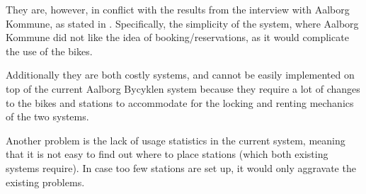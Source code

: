 They are, however, in conflict with the results from the interview with Aalborg Kommune, as stated in .
Specifically, the simplicity of the system, where Aalborg Kommune did not like the idea of booking/reservations, as it would complicate the use of the bikes.

Additionally they are both costly systems, and cannot be easily implemented on top of the current Aalborg Bycyklen system because they require a lot of changes to the bikes and stations to accommodate for the locking and renting mechanics of the two systems. 

Another problem is the lack of usage statistics in the current system, meaning that it is not easy to find out where to place stations (which both existing systems require).
In case too few stations are set up, it would only aggravate the existing problems.
